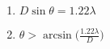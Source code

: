 

\vspace*{\fill}
\centering

\begin{enumerate}
    \item $D\sin{\theta} = 1.22\lambda$
    \item $\theta > \arcsin{\Big(\frac{1.22\lambda}{D}\Big)}$ 
\end{enumerate}

\centering
\vspace*{\fill}

